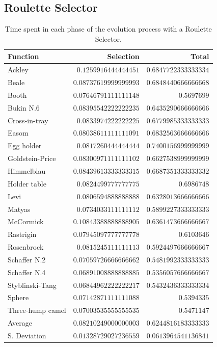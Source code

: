  \subsection{Roulette Selector}
      \centering
      \begin{longtable}{|l|r|r|}
        
      \caption{
        Time spent in each phase of the evolution process with a Roulette Selector.
      }
      \label{tab:fn_opt:results:time}\\
        \hline
        Function  & Selection & Total \\
        \hline\hline
       Ackley	& $0.1259916444444451$	& $0.6847722333333334$	\\\hline
       Beale	& $0.08737619999999993$	& $0.6848440666666668$	\\\hline
       Booth	& $0.07646791111111148$	& $0.5697699$	\\\hline
       Bukin N.6	& $0.08395542222222235$	& $0.6435290666666666$	\\\hline
       Cross-in-tray	& $0.0833974222222225$	& $0.6779985333333333$	\\\hline
       Easom	& $0.08038611111111091$	& $0.6832563666666666$	\\\hline
       Egg holder	& $0.0817260444444444$	& $0.7400156999999999$	\\\hline
       Goldstein-Price	& $0.08300971111111102$	& $0.6627538999999999$	\\\hline
       Himmelblau	& $0.08439613333333315$	& $0.6687351333333332$	\\\hline
       Holder table	& $0.0824499777777775$	& $0.6986748$	\\\hline
       Levi	& $0.0806594888888888$	& $0.6328013666666666$	\\\hline
       Matyas	& $0.0734033111111112$	& $0.5899227333333333$	\\\hline
       McCormick	& $0.10843388888888905$	& $0.6361473666666667$	\\\hline
       Rastrigin	& $0.07945097777777778$	& $0.6103646$	\\\hline
       Rosenbrock	& $0.0815245111111113$	& $0.5924497666666667$	\\\hline
       Schaffer N.2	& $0.07059726666666662$	& $0.5481992333333333$	\\\hline
       Schaffer N.4	& $0.06891008888888885$	& $0.5356057666666667$	\\\hline
       Styblinski-Tang	& $0.06844962222222217$	& $0.5432436333333334$	\\\hline
       Sphere	& $0.07142871111111088$	& $0.5394335$	\\\hline
       Three-hump camel	& $0.07003535555555535$	& $0.5471147$	\\\hline
      \hline Average	& $0.08210249000000003$	& $0.6244816183333333$ \\\hline
      S. Deviation	& $0.01328729027236559$	& $0.0613964541136841$ \\\hline
      \end{longtable}

